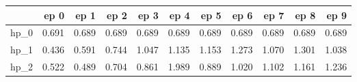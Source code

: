 \begin{tabular}{lrrrrrrrrrr}
\toprule
{} &   ep 0 &   ep 1 &   ep 2 &   ep 3 &   ep 4 &   ep 5 &   ep 6 &   ep 7 &   ep 8 &   ep 9 \\
\midrule
hp\_0 &  0.691 &  0.689 &  0.689 &  0.689 &  0.689 &  0.689 &  0.689 &  0.689 &  0.689 &  0.689 \\
hp\_1 &  0.436 &  0.591 &  0.744 &  1.047 &  1.135 &  1.153 &  1.273 &  1.070 &  1.301 &  1.038 \\
hp\_2 &  0.522 &  0.489 &  0.704 &  0.861 &  1.989 &  0.889 &  1.020 &  1.102 &  1.161 &  1.236 \\
\bottomrule
\end{tabular}
